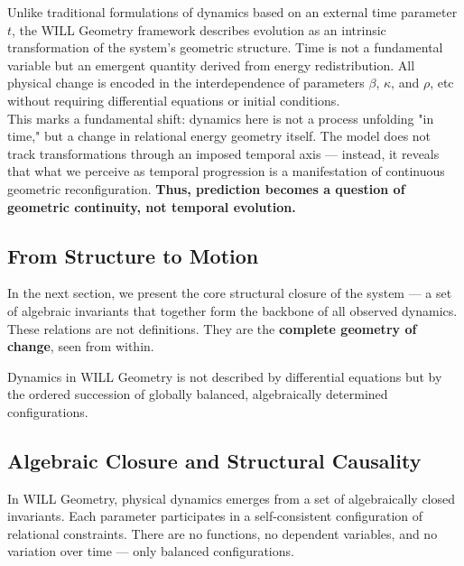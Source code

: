 \documentclass[12pt, a4paper]{article}
\begin{document}
\begin{tcolorbox}[colback=gray!5,colframe=black!40!black,title=Note for readers accustomed to classical dynamics]
Unlike traditional formulations of dynamics based on an external time parameter \(t\), the WILL Geometry framework describes evolution as an intrinsic transformation of the system's geometric structure. Time is not a fundamental variable but an emergent quantity derived from energy redistribution. All physical change is encoded in the interdependence of parameters \(\beta\), \(\kappa\), and \(\rho\), etc without requiring differential equations or initial conditions.\\

This marks a fundamental shift: dynamics here is not a process unfolding "in time," but a change in relational energy geometry itself. The model does not track transformations through an imposed temporal axis — instead, it reveals that what we perceive as temporal progression is a manifestation of continuous geometric reconfiguration. \textbf{Thus, prediction becomes a question of geometric continuity, not temporal evolution.}
\end{tcolorbox}

\subsection*{From Structure to Motion}

In the next section, we present the core structural closure of the system ---  
a set of algebraic invariants that together form the backbone of all observed dynamics.  
These relations are not definitions.  
They are the \textbf{complete geometry of change}, seen from within.

\begin{tcolorbox}[colback=gray!5, colframe=black!80!black, title=Dynamics in WILL Geometry]
Dynamics in WILL Geometry is not described by differential equations
but by the ordered succession of globally balanced, algebraically determined configurations.
\end{tcolorbox}

\subsection{Algebraic Closure and Structural Causality}

In WILL Geometry, physical dynamics emerges from a set of algebraically closed invariants.  
Each parameter participates in a self-consistent configuration of relational constraints.  
There are no functions, no dependent variables, and no variation over time --- only balanced configurations.
\end{document}
